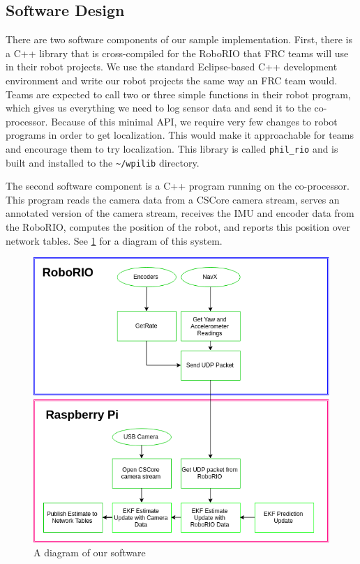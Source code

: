 \documentclass{article}
\begin{document}
  \subsection{Software Design}

    There are two software components of our sample implementation. First, there is a C++ library that is cross-compiled for the RoboRIO that FRC teams will use in their robot projects. We use the standard Eclipse-based C++ development environment and write our robot projects the same way an FRC team would. Teams are expected to call two or three simple functions in their robot program, which gives us everything we need to log sensor data and send it to the co-processor. Because of this minimal API, we require very few changes to robot programs in order to get localization. This would make it approachable for teams and encourage them to try localization. This library is called \texttt{phil\_rio} and is built and installed to the \texttt{\textasciitilde/wpilib} directory.

    The second software component is a C++ program running on the co-processor. This program reads the camera data from a CSCore camera stream, serves an annotated version of the camera stream, receives the IMU and encoder data from the RoboRIO, computes the position of the robot, and reports this position over network tables. See \ref{fig:software_diagram} for a diagram of this system.

    \begin{figure}[H]
      \centering
      \includegraphics[width=1\linewidth]{./images/MQP_System_Chart.png}
      \caption{A diagram of our software}
      \label{fig:software_diagram}
    \end{figure}
\end{document}
